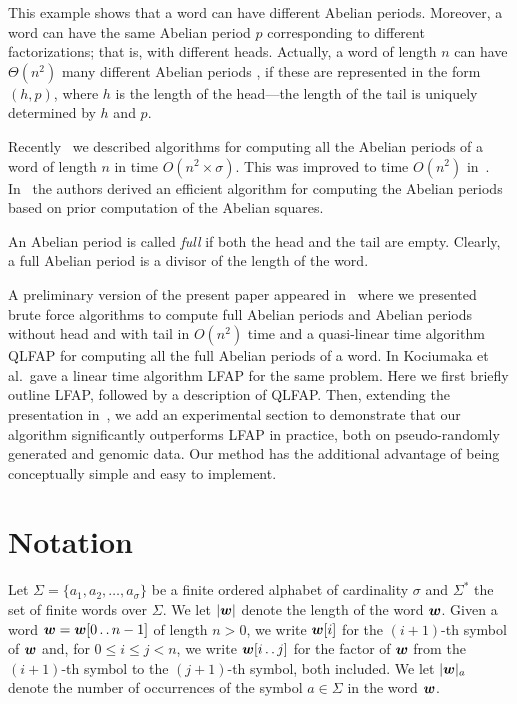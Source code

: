 \documentclass[3p]{elsarticle}
\def\pp{\mathinner{\ldotp\ldotp}}
\def\s#1{\mbox{\boldmath $#1$}}
\begin{document}
This example shows that a word can have different Abelian periods. Moreover, a word can have the same Abelian period $p$ corresponding to different factorizations; that is, with different heads. Actually, a word of length $n$ can have $\Theta(n^{2})$ many different Abelian periods \cite{DAM}, if these are represented in the form $(h,p)$, where $h$ is the length of the head---the length of the tail is uniquely determined by $h$ and $p$.

Recently~\cite{PSC2011-16,DAM} we described algorithms for computing all the
 Abelian periods
 of a word of length $n$ in time $O(n^2 \times \sigma)$.
This was improved to time $O(n^2)$ in~\cite{MichalisChrist2012}.
In~\cite{CIKKPRRTW2012} the authors derived an 
 efficient
 algorithm for computing the Abelian periods 
based on prior computation of the Abelian squares.

An Abelian period is called \emph{full} if both the head and the tail are empty. Clearly, a full Abelian period is a divisor of the length of the word.

A preliminary version of the present paper appeared in~\cite{FiLeLePrSm12}
 where we presented brute force algorithms to compute full Abelian periods
 and Abelian periods without head and with tail in $O(n^2)$ time and a 
 quasi-linear time algorithm QLFAP for
 computing all the full Abelian periods of a word.
In \cite{KoRaRy13} Kociumaka et al.~gave a linear time algorithm LFAP for the same problem.
Here we first briefly outline LFAP,
followed by a description of QLFAP.
Then, extending the presentation in~\cite{FiLeLePrSm12},
we add an experimental section to demonstrate that our algorithm
significantly outperforms LFAP in practice,
both on pseudo-randomly generated and genomic data.
Our method has the additional
advantage of being conceptually simple and easy to implement.
  
\section{Notation}
\label{sec-def}

Let $\Sigma=\{a_{1},a_{2},\ldots,a_{\sigma}\}$ be a finite ordered
 alphabet of cardinality $\sigma$ and $\Sigma^*$ the set of finite words
 over $\Sigma$. 
We let $|\s{w}|$ denote the length of the word $\s{w}$.
Given a word $\s{w}=\s{w}[0\pp n-1]$ of length $n>0$, we write $\s{w}[i]$ for the $(i+1)$-th symbol of $\s{w}$
 and, for $0\leqslant i \leqslant j< n$, we write $\s{w}[i\pp j]$ for the factor of $\s{w}$
 from the $(i+1)$-th symbol to the $(j+1)$-th symbol, both included.
We let $|\s{w}|_a$ denote the number of occurrences of the symbol
 $a\in\Sigma$ in the word $\s{w}$. 
\end{document}
